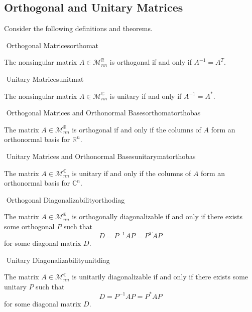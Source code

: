     \subsection{Orthogonal and Unitary Matrices}

        Consider the following definitions and theorems.
        \begin{definition}{\Stop\,\,Orthogonal Matrices}{orthomat}

            The nonsingular matrix \(A\in\mathcal{M}_{nn}^\mathbb{R}\) is orthogonal if and only if \(A^{-1}=A^T\).
            
        \end{definition}
        \begin{definition}{\Stop\,\,Unitary Matrices}{unitmat}

            The nonsingular matrix \(A\in\mathcal{M}_{nn}^\mathbb{C}\) is unitary if and only if \(A^{-1}=A^*\).
            
        \end{definition}
        \begin{theorem}{\Stop\,\,Orthogonal Matrices and Orthonormal Bases}{orthomatorthobas}

            The matrix \(A\in\mathcal{M}_{nn}^\mathbb{R}\) is orthogonal if and only if the columns of \(A\) form an orthonormal basis for \(\mathbb{R}^n\).
            
        \end{theorem}
        \begin{theorem}{\Stop\,\,Unitary Matrices and Orthonormal Bases}{unitarymatorthobas}

            The matrix \(A\in\mathcal{M}_{nn}^\mathbb{C}\) is unitary if and only if the columns of \(A\) form an orthonormal basis for \(\mathbb{C}^n\).
            
        \end{theorem}
        \begin{definition}{\Stop\,\,Orthogonal Diagonalizability}{orthodiag}

            The matrix \(A\in\mathcal{M}_{nn}^\mathbb{R}\) is orthogonally diagonalizable if and only if there exists some orthogonal \(P\) such that
            \begin{equation*}
                D=P^{-1}AP=P^TAP
            \end{equation*}
            for some diagonal matrix \(D\).
            
        \end{definition}
        \begin{definition}{\Stop\,\,Unitary Diagonalizability}{unitdiag}

            The matrix \(A\in\mathcal{M}_{nn}^\mathbb{C}\) is unitarily diagonalizable if and only if there exists some unitary \(P\) such that
            \begin{equation*}
                D=P^{-1}AP=P^*AP
            \end{equation*}
            for some diagonal matrix \(D\).
            
        \end{definition}
